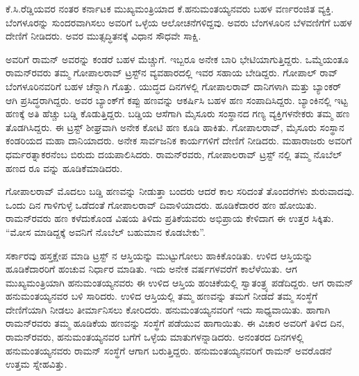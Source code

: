 
\vskip 2pt

ಕೆ.ಸಿ.ರೆಡ್ಡಿಯವರ ನಂತರ ಕರ್ನಾಟಕ ಮುಖ್ಯಮಂತ್ರಿಯಾದ ಕೆ.ಹನುಮಂತಯ್ಯನವರು ಬಹಳ ವರ್ಣರಂಜಿತ ವ್ಯಕ್ತಿ. ಬೆಂಗಳೂರನ್ನು ಸುಂದರವಾಗಿಸಲು ಅವರಿಗೆ ಒಳ್ಳೆಯ ಆಲೋಚನೆಗಳಿದ್ದವು. ಅವರು ಬೆಂಗಳೂರಿನ ಬೆಳವಣಿಗೆಗೆ ಬಹಳ ದೇಣಿಗೆ ನೀಡಿದರು. ಅವರ ಮುತ್ಸದ್ಧಿತನಕ್ಕೆ ವಿಧಾನ ಸೌಧವೇ ಸಾಕ್ಷಿ.

ಅವರಿಗೆ ರಾಮನ್ ಅವರನ್ನು ಕಂಡರೆ ಬಹಳ ಮೆಚ್ಚುಗೆ. ಇಬ್ಬರೂ ಅನೇಕ ಬಾರಿ ಭೇಟಿಯಾಗುತ್ತಿದ್ದರು. ಒಮ್ಮೆಯಂತೂ ರಾಮನ್‍ರವರು ತಮ್ಮ ಗೋಪಾಲರಾವ್ ಟ್ರಸ್ಟ್‌ನ ವ್ಯವಹಾರದಲ್ಲಿ ಇವರ ಸಹಾಯ ಬೇಡಿದ್ದರು. ಗೋಪಾಲ್ ರಾವ್ ಬೆಂಗಳೂರಿನವರಿಗೆ ಬಹಳ ಚೆನ್ನಾಗಿ ಗೊತ್ತು. ಯುದ್ಧದ ದಿನಗಳಲ್ಲಿ ಗೋಪಾಲರಾವ್ ದಾನಿಗಳಾಗಿ ಮತ್ತು ಬ್ಯಾಂಕರ್ ಆಗಿ ಪ್ರಸಿದ್ಧರಾಗಿದ್ದರು. ಅವರ ಬ್ಯಾಂಕ್‍ಗೆ ಕಪ್ಪು ಹಣವನ್ನು ಆಕರ್ಷಿಸಿ ಬಹಳ ಹಣ ಸಂಪಾದಿಸಿದ್ದರು. ಬ್ಯಾಂಕಿನಲ್ಲಿ ಇಟ್ಟ ಹಣಕ್ಕೆ ಅತಿ ಹೆಚ್ಚು ಬಡ್ಡಿ ಕೊಡುತ್ತಿದ್ದರು. ಬಡ್ಡಿಯ ಆಸೆಗಾಗಿ ಮೈಸೂರು ಸಂಸ್ಥಾನದ ಗಣ್ಯ ವ್ಯಕ್ತಿಗಳನೇಕರು ತಮ್ಮ ಹಣ ತೊಡಗಿಸಿದ್ದರು. ಈ ಟ್ರಸ್ಟ್ ಶೀಘ್ರವಾಗಿ ಅನೇಕ ಕೋಟಿ ಹಣ ಕೂಡಿ ಹಾಕಿತು. ಗೋಪಾಲರಾವ್, ಮೈಸೂರು ಸಂಸ್ಥಾನ ಕಂಡರಿಯದ ಮಹಾ ದಾನಿಯಾದರು. ಅನೇಕ ಸಾರ್ವಜನಿಕ ಕಾರ್ಯಗಳಿಗೆ ದೇಣಿಗೆ ನೀಡಿದರು. ಮಹಾರಾಜರು ಅವರಿಗೆ ಧರ್ಮರತ್ನಾಕರನೆಂಬ ಬಿರುದು ದಯಪಾಲಿಸಿದರು. ರಾಮನ್‍ರವರು, ಗೋಪಾಲರಾವ್ ಟ್ರಸ್ಟ್ ನಲ್ಲಿ ತಮ್ಮ ನೊಬೆಲ್ ಹಣದ ರೂ  ವನ್ನು ಹೂಡಿಕೆಮಾಡಿದರು.

ಗೋಪಾಲರಾವ್ ಮೊದಲು ಬಡ್ಡಿ ಹಣವನ್ನು ನೀಡುತ್ತಾ ಬಂದರು ಆದರೆ ಕಾಲ ಸರಿದಂತೆ ತೊಂದರೆಗಳು ಶುರುವಾದವು. ಒಂದು ದಿನ ಗಾಳಿಗುಳ್ಳೆ ಒಡೆದಂತೆ ಗೋಪಾಲರಾವ್ ದಿವಾಳಿಯಾದರು. ಹೂಡಿಕೆದಾರರ ಹಣ ಹೋಯಿತು. ರಾಮನ್‍ರವರು ಹಣ ಕಳೆದುಕೊಂಡ ವಿಷಯ ತಿಳಿದು ಪ್ರತಿಕೆಯವರು ಅಭಿಪ್ರಾಯ ಕೇಳಿದಾಗ ಈ ಉತ್ತರ ಸಿಕ್ಕಿತು. “ಮೋಸ ಮಾಡಿದ್ದಕ್ಕೆ ಅವನಿಗೆ ನೊಬೆಲ್ ಬಹುಮಾನ ಕೊಡಬೇಕು”.

ಸರ್ಕಾರವು ಹಸ್ತಕ್ಷೇಪ ಮಾಡಿ ಟ್ರಸ್ಟ್ ನ ಆಸ್ತಿಯನ್ನು ಮುಟ್ಟುಗೋಲು ಹಾಕಿಕೊಂಡಿತು. ಉಳಿದ ಆಸ್ತಿಯನ್ನು ಹೂಡಿಕೆದಾರರಿಗೆ ಹಂಚುವ ನಿರ್ಧಾರ ಮಾಡಿತು. ಇದು ಅನೇಕ ವರ್ಷಗಳವರೆಗೆ ಕಾಲೆಳೆಯಿತು. ಆಗ ಮುಖ್ಯಮಂತ್ರಿಯಾಗಿ ಹನುಮಂತಯ್ಯನವರು ಈ ಉಳಿದ ಆಸ್ತಿಯ ಹಂಚಿಕೆಯಲ್ಲಿ ಸ್ವಾತಂತ್ರ್ಯ ಪಡೆದಿದ್ದರು. ಆಗ ರಾಮನ್ ಹನುಮಂತಯ್ಯನವರ ಬಳಿ ಸಾರಿದರು. ಉಳಿದ ಆಸ್ತಿಯಲ್ಲಿ ತಮ್ಮ ಹಣವನ್ನು ತಮಗೆ ನೀಡದೆ ತಮ್ಮ ಸಂಸ್ಥೆಗೆ ದೇಣಿಗೆಯಾಗಿ ನೀಡಲು ತೀರ್ಮಾನಿಸಲು ಕೋರಿದರು. ಹನುಮಂತಯ್ಯನವರಿಗೆ ಇದು ಸಾಧ್ಯವಾಯಿತು. ಹಾಗಾಗಿ ರಾಮನ್‍ರವರು ತಮ್ಮ ಹೂಡಿಕೆಯ ಹಣವನ್ನು ಸಂಸ್ಥೆಗೆ ಪಡೆಯುವ ಹಾಗಾಯಿತು. ಈ ವಿಚಾರ ಅವರಿಗೆ ತಿಳಿದ ದಿನ, ರಾಮನ್‍ರವರು, ಹನುಮಂತಯ್ಯನವರ ಬಗೆಗೆ ಒಳ್ಳೆಯ ಮಾತುಗಳನ್ನಾಡಿದರು. ಅನಂತರದ ದಿನಗಳಲ್ಲಿ ಹನುಮಂತಯ್ಯನವರು ರಾಮನ್ ಸಂಸ್ಥೆಗೆ ಆಗಾಗ ಬರುತ್ತಿದ್ದರು. ಹನುಮಂತಯ್ಯನವರಿಗೆ ರಾಮನ್ ಅವರೊಡನೆ ಉತ್ತಮ ಸ್ನೇಹವಿತ್ತು.

